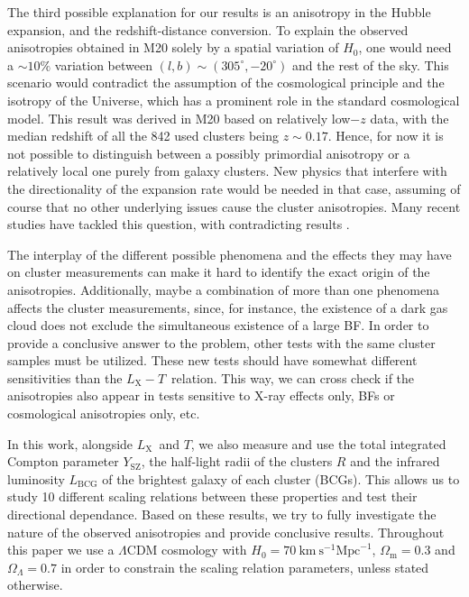 \documentclass{aa}   %
\newcommand{\LT}{$L_{\text{X}}-T$}
\newcommand{\Lx}{$L_{\text{X}}$}
\newcommand{\Ysz}{$Y_{\text{SZ}}$}
\begin{document}
The third possible explanation for our results is an anisotropy in the Hubble expansion, and the redshift-distance conversion. To explain the observed anisotropies obtained in M20 solely by a spatial variation of $H_0$, one would need a $\sim 10\%$ variation between $(l,b)\sim (305^{\circ},-20^{\circ})$ and the rest of the sky. This scenario would contradict the assumption of the cosmological principle and the isotropy of the Universe, which has a prominent role in the standard cosmological model. This result was derived in M20 based on relatively low$-z$ data, with the median redshift of all the 842 used clusters being $z\sim 0.17$. Hence, for now it is not possible to distinguish between a possibly primordial anisotropy or a relatively local one purely from galaxy clusters. New physics that interfere with the directionality of the expansion rate would be needed in that case, assuming of course that no other underlying issues cause the cluster anisotropies. Many recent studies have tackled this question, with contradicting results \citep[e.g.,][see Sect. \ref{discussion} for an extended discussion]{bolejko,bengaly18,colin19,soltis,andrade19,hu,fosalba,salehi,secrest}.

The interplay of the different possible phenomena and the effects they may have on cluster measurements can make it hard to identify the exact origin of the anisotropies. Additionally, maybe a combination of more than one phenomena affects the cluster measurements, since, for instance, the existence of a dark gas cloud does not exclude the simultaneous existence of a large BF. In order to provide a conclusive answer to the problem, other tests with the same cluster samples must be utilized. These new tests should have somewhat different sensitivities than the \LT\ relation. This way, we can cross check if the anisotropies also appear in tests sensitive to X-ray effects only, BFs or cosmological anisotropies only, etc.

In this work, alongside \Lx\ and $T$, we also measure and use the total integrated Compton parameter \Ysz, the half-light radii of the clusters $R$ and the infrared luminosity $L_{\text{BCG}}$ of the brightest galaxy of each cluster (BCGs). This allows us to study 10 different scaling relations between these properties and test their directional dependance. Based on these results, we try to fully investigate the nature of the observed anisotropies and provide conclusive results. Throughout this paper we use a $\Lambda$CDM cosmology with $H_0=70\  \text{km}\  \text{s}^{-1} \text{Mpc}^{-1}$, $\Omega_{\text{m}}=0.3$ and $\Omega_{\Lambda}=0.7$ in order to constrain the scaling relation parameters, unless stated otherwise.
\end{document}

